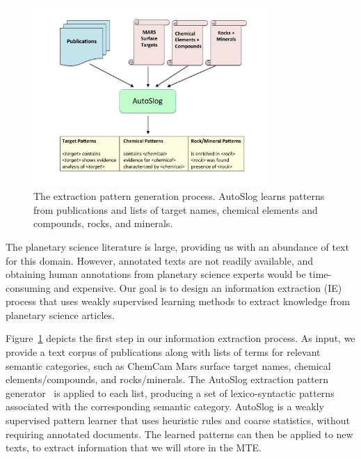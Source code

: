 \documentclass[letterpaper]{article}
\begin{document}
\begin{figure}
\centerline{\includegraphics[width=3.5in]{fig/autoslog-pic.pdf}}
\caption{The extraction pattern generation process. AutoSlog learns
patterns from publications and lists of target names, chemical
elements and compounds, rocks, and minerals.}
\label{fig:ie}
\end{figure}

The planetary science literature is large, providing us with an
abundance of text for this domain.  However, annotated texts are not
readily available, and obtaining human annotations from planetary
science experts would be time-consuming and expensive.  Our goal is
to design an information extraction (IE) process that uses weakly
supervised learning methods to extract knowledge from planetary
science articles.  

Figure~\ref{fig:ie} depicts the first step in our information
extraction process.  As input, we provide a text corpus of
publications along with lists of terms for relevant semantic
categories, such as ChemCam Mars surface target names, chemical
elements/compounds, and rocks/minerals. The AutoSlog extraction
pattern 
generator~\cite{riloff:autoslog93,riloff:autoslog96} is applied to
each list, producing a set of lexico-syntactic patterns associated
with the corresponding semantic category.  AutoSlog is a weakly
supervised pattern learner that uses heuristic rules and coarse
statistics, without requiring annotated documents. The learned
patterns can then be applied to new texts, to extract information that
we will store in the MTE. 
\end{document}
